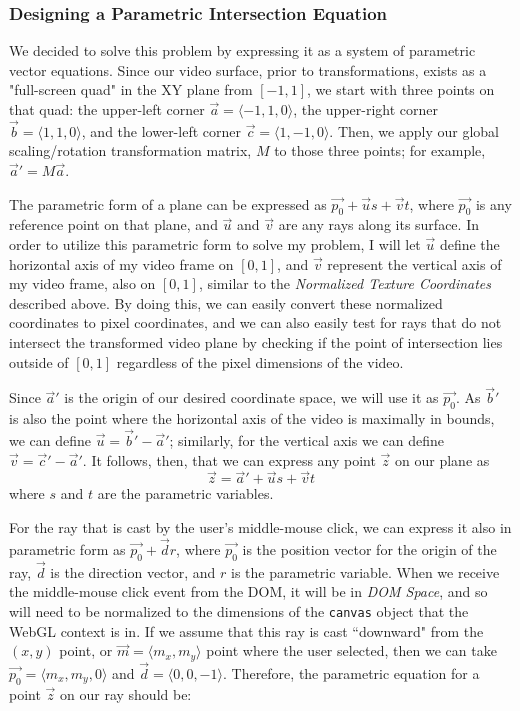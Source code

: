 \subsubsection{Designing a Parametric Intersection Equation}
    We decided to solve this problem by expressing it as a system of parametric vector equations. Since our video surface, prior to transformations, exists as a "full-screen quad" in the XY plane from $[-1,1]$, we start with three points on that quad: the upper-left corner $\vec{a}=\langle-1,1,0\rangle$, the upper-right corner $\vec{b}=\langle1,1,0\rangle$, and the lower-left corner $\vec{c}=\langle1,-1,0\rangle$. Then, we apply our global scaling/rotation transformation matrix, $M$ to those three points; for example, $\vec{a}'=M\vec{a}$.\par
    The parametric form of a plane can be expressed as $\vec{p_0}+\vec{u}s+\vec{v}t$, where $\vec{p_0}$ is any reference point on that plane, and $\vec{u}$ and $\vec{v}$ are any rays along its surface. In order to utilize this parametric form to solve my problem, I will let $\vec{u}$ define the horizontal axis of my video frame on $[0,1]$, and $\vec{v}$ represent the vertical axis of my video frame, also on $[0,1]$, similar to the \emph{Normalized Texture Coordinates} described above. By doing this, we can easily convert these normalized coordinates to pixel coordinates, and we can also easily test for rays that do not intersect the transformed video plane by checking if the point of intersection lies outside of $[0,1]$ regardless of the pixel dimensions of the video.\par
    Since $\vec{a}'$ is the origin of our desired coordinate space, we will use it as $\vec{p_0}$. As $\vec{b}'$ is also the point where the horizontal axis of the video is maximally in bounds, we can define $\vec{u}=\vec{b}'-\vec{a}'$; similarly, for the vertical axis we can define $\vec{v}=\vec{c}'-\vec{a}'$. It follows, then, that we can express any point $\vec{z}$ on our plane as
    \begin{equation}
    \vec{z}=\vec{a}'+\vec{u}s+\vec{v}t
    \end{equation}
where $s$ and $t$ are the parametric variables.\par
    For the ray that is cast by the user's middle-mouse click, we can express it also in parametric form as $\vec{p_0}+\vec{d}r$, where $\vec{p_0}$ is the position vector for the origin of the ray, $\vec{d}$ is the direction vector, and $r$ is the parametric variable. When we receive the middle-mouse click event from the DOM, it will be in \emph{DOM Space}, and so will need to be normalized to the dimensions of the \texttt{canvas} object that the WebGL context is in. If we assume that this ray is cast ``downward" from the $(x,y)$ point, or $\vec{m}=\langle m_x, m_y \rangle$ point where the user selected, then we can take $\vec{p_0}=\langle m_x, m_y, 0 \rangle$ and $\vec{d}=\langle 0, 0, -1 \rangle$. Therefore, the parametric equation for a point $\vec{z}$ on our ray should be:
